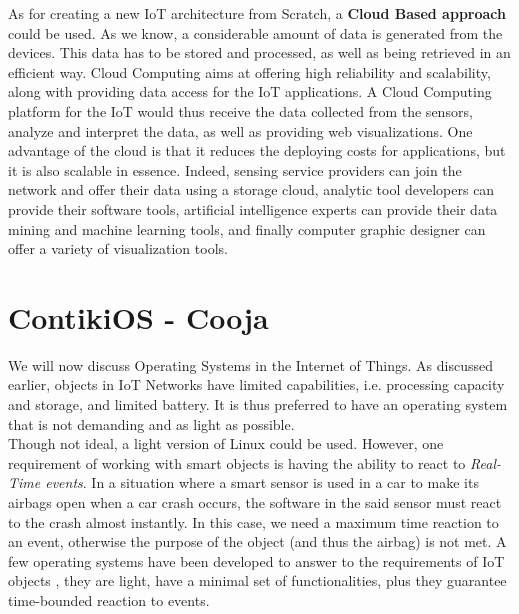 As for creating a new IoT architecture from Scratch, a \textbf{Cloud Based approach} could be used. As we know, a considerable amount of data is generated from the devices. This data has to be stored and processed, as well as being retrieved in an efficient way. Cloud Computing aims at offering high reliability and scalability, along with providing data access for the IoT applications. A Cloud Computing platform for the IoT would thus receive the data collected from the sensors, analyze and interpret the data, as well as providing web visualizations. One advantage of the cloud is that it reduces the deploying costs for applications, but it is also scalable in essence. Indeed, sensing service providers can join the network and offer their data using a storage cloud, analytic tool developers can provide their software tools, artificial intelligence experts can provide their data mining and machine learning tools, and finally computer graphic designer can offer a variety of visualization tools.




\chapter{ContikiOS - Cooja}
\label{chap:contiki}

We will now discuss Operating Systems in the Internet of Things. As discussed earlier, objects in IoT Networks have limited capabilities, i.e. processing capacity and storage, and limited battery. It is thus preferred to have an operating system that is not demanding and as light as possible. \\

Though not ideal, a light version of Linux could be used. However, one requirement of working with smart objects is having the ability to react to \textit{Real-Time events}. In a situation where a smart sensor is used in a car to make its airbags open when a car crash occurs, the software in the said sensor must react to the crash almost instantly. In this case, we need a maximum time reaction to an event, otherwise the purpose of the object (and thus the airbag) is not met. A few operating systems have been developed to answer to the requirements of IoT objects \cite{website:iot_os}, they are light, have a minimal set of functionalities, plus they guarantee time-bounded reaction to events.\\

